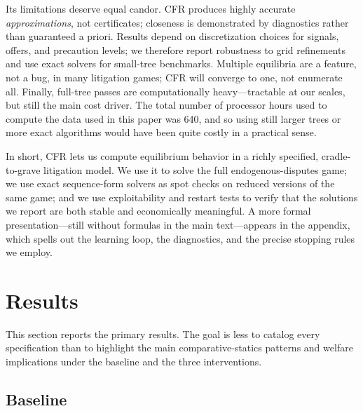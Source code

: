 \documentclass{article}
\begin{document}
Its limitations deserve equal candor. CFR produces highly accurate \emph{approximations}, not certificates; closeness is demonstrated by diagnostics rather than guaranteed a priori. Results depend on discretization choices for signals, offers, and precaution levels; we therefore report robustness to grid refinements and use exact solvers for small-tree benchmarks. Multiple equilibria are a feature, not a bug, in many litigation games; CFR will converge to one, not enumerate all. Finally, full-tree passes are computationally heavy—tractable at our scales, but still the main cost driver. The total number of processor hours used to compute the data used in this paper was 640, and so using still larger trees or more exact algorithms would have been quite costly in a practical sense.

In short, CFR lets us compute equilibrium behavior in a richly specified, cradle-to-grave litigation model. We use it to solve the full endogenous-disputes game; we use exact sequence-form solvers as spot checks on reduced versions of the same game; and we use exploitability and restart tests to verify that the solutions we report are both stable and economically meaningful. A more formal presentation—still without formulas in the main text—appears in the appendix, which spells out the learning loop, the diagnostics, and the precise stopping rules we employ.

\section{Results}

This section reports the primary results. The goal is less to catalog every specification than to highlight the main comparative-statics patterns and welfare implications under the baseline and the three interventions.

\subsection{Baseline}
\end{document}
